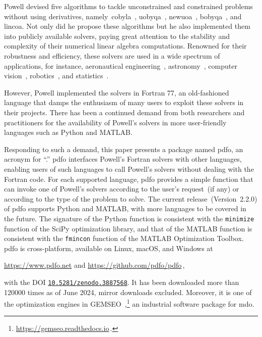 \documentclass[smallextended]{svjour3}
\newcommand{\modified}[1]{#1}
\begin{document}
Powell devised five algorithms to tackle unconstrained and constrained problems without using derivatives, namely~\gls{cobyla}~\cite{Powell_1994}, \gls{uobyqa}~\cite{Powell_2002}, \gls{newuoa}~\cite{Powell_2006}, \gls{bobyqa}~\cite{Powell_2009}, and \gls{lincoa}.
\modified{Not only did he} propose these algorithms but \modified{he} also implemented them into publicly available solvers, paying great attention to the stability and complexity of their numerical linear algebra computations.
Renowned for their robustness and efficiency, these solvers are used in a wide spectrum of applications, for instance, aeronautical engineering~\cite{Gallard_Etal_2018}, astronomy~\cite{Mamon_Biviano_Boue_2013}, computer vision~\cite{Izadinia_Shan_Seitz_2017}, robotics~\cite{Mombaur_Truong_Laumond_2010}, and statistics~\cite{Bates_Etal_2015}.

However, Powell \modified{implemented} the solvers in Fortran 77, an \modified{old-fashioned} language that damps the enthusiasm of many users to exploit these solvers in their projects.
There has been a continued demand from both researchers and practitioners for the availability of Powell's solvers in more user-friendly languages such as Python and MATLAB.

Responding to such a demand, this paper presents a package named \gls{pdfo}, an acronym for ``.''
\Gls{pdfo} interfaces Powell's Fortran solvers with other languages, enabling users of such languages to call Powell's solvers without dealing with the Fortran code.
For each supported language, \gls{pdfo} provides a simple function that can invoke one of Powell's solvers according to the user's request~(if any) or according to the type of the problem to solve.
The current release~(Version~\modified{2.2.0}) of \gls{pdfo} supports Python and MATLAB, with more languages to be covered in the future.
The signature of the Python function is consistent with the \texttt{minimize} function of the SciPy optimization library, and that of the MATLAB function is consistent with the \texttt{fmincon} function of the MATLAB Optimization Toolbox.
\Gls{pdfo} is cross-platform, available on Linux, macOS, and Windows at
\begin{center}
    \url{https://www.pdfo.net} \quad and \quad \url{https://github.com/pdfo/pdfo}\,,
\end{center}
with the DOI \href{https://doi.org/10.5281/zenodo.3887568}{\texttt{10.5281/zenodo.3887568}}.
It has been downloaded more than \modified{\num{120000}} times as of \modified{June} 2024, mirror downloads excluded.
Moreover, it is one of the optimization engines in GEMSEO~\cite{Gallard_Etal_2018},\footnote{\url{https://gemseo.readthedocs.io}\,.} an industrial software package for \gls{mdo}.
\end{document}
